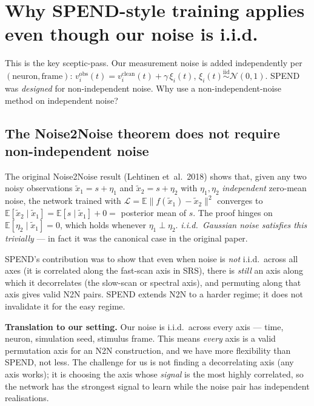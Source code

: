 \documentclass[11pt]{article}
\begin{document}
\section{Why SPEND-style training applies even though our noise is i.i.d.}

This is the key sceptic-pass. Our measurement noise is added independently
per $(\text{neuron}, \text{frame})$:
$v^{\text{obs}}_i(t) = v^{\text{clean}}_i(t) + \gamma\, \xi_i(t)$,
$\xi_i(t) \overset{\text{iid}}{\sim} \mathcal N(0,1)$.
SPEND was \emph{designed} for non-independent noise. Why use a
non-independent-noise method on independent noise?

\subsection{The Noise2Noise theorem does not require non-independent noise}

The original Noise2Noise result (Lehtinen et~al.\ 2018) shows that, given
any two noisy observations $\widetilde x_1 = s + \eta_1$ and
$\widetilde x_2 = s + \eta_2$ with $\eta_1, \eta_2$ \emph{independent}
zero-mean noise, the network trained with
$\mathcal L = \mathbb E \|f(\widetilde x_1) - \widetilde x_2\|^2$
converges to $\mathbb E[\widetilde x_2 \mid \widetilde x_1] =
\mathbb E[s \mid \widetilde x_1] + 0 = $ posterior mean of $s$. The proof
hinges on $\mathbb E[\eta_2 \mid \widetilde x_1] = 0$, which holds whenever
$\eta_1 \perp \eta_2$. \emph{i.i.d.\ Gaussian noise satisfies this trivially}
--- in fact it was the canonical case in the original paper.

SPEND's contribution was to show that even when noise is \emph{not} i.i.d.\
across all axes (it is correlated along the fast-scan axis in SRS), there is
\emph{still} an axis along which it decorrelates (the slow-scan or spectral
axis), and permuting along that axis gives valid N2N pairs. SPEND extends
N2N to a harder regime; it does not invalidate it for the easy regime.

\textbf{Translation to our setting.} Our noise is i.i.d.\ across every axis
--- time, neuron, simulation seed, stimulus frame. This means \emph{every}
axis is a valid permutation axis for an N2N construction, and we have more
flexibility than SPEND, not less. The challenge for us is not finding a
decorrelating axis (any axis works); it is choosing the axis whose
\emph{signal} is the most highly correlated, so the network has the
strongest signal to learn while the noise pair has independent realisations.
\end{document}
